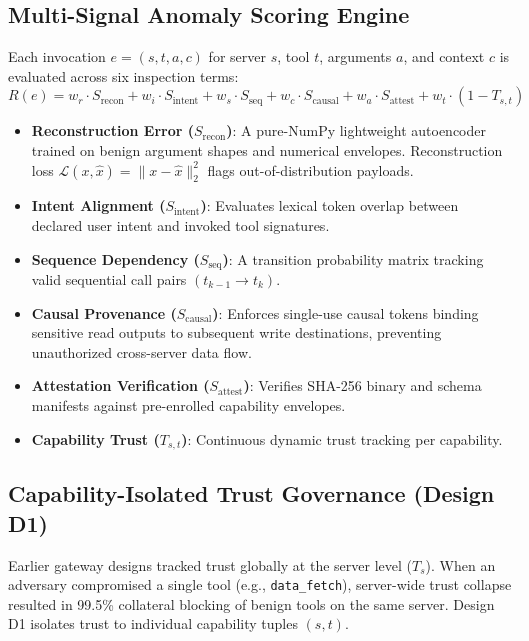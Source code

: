 \documentclass{llncs}
\begin{document}
\subsection{Multi-Signal Anomaly Scoring Engine}
Each invocation $e = (s, t, a, c)$ for server $s$, tool $t$, arguments $a$, and context $c$ is evaluated across six inspection terms:
\begin{equation}
R(e) = w_r \cdot S_{\text{recon}} + w_i \cdot S_{\text{intent}} + w_s \cdot S_{\text{seq}} + w_c \cdot S_{\text{causal}} + w_a \cdot S_{\text{attest}} + w_t \cdot (1 - T_{s,t})
\end{equation}
\begin{itemize}
    \item \textbf{Reconstruction Error ($S_{\text{recon}}$)}: A pure-NumPy lightweight autoencoder trained on benign argument shapes and numerical envelopes. Reconstruction loss $\mathcal{L}(x, \hat{x}) = \|x - \hat{x}\|_2^2$ flags out-of-distribution payloads.
    \item \textbf{Intent Alignment ($S_{\text{intent}}$)}: Evaluates lexical token overlap between declared user intent and invoked tool signatures.
    \item \textbf{Sequence Dependency ($S_{\text{seq}}$)}: A transition probability matrix tracking valid sequential call pairs $(t_{k-1} \to t_k)$.
    \item \textbf{Causal Provenance ($S_{\text{causal}}$)}: Enforces single-use causal tokens binding sensitive read outputs to subsequent write destinations, preventing unauthorized cross-server data flow.
    \item \textbf{Attestation Verification ($S_{\text{attest}}$)}: Verifies SHA-256 binary and schema manifests against pre-enrolled capability envelopes.
    \item \textbf{Capability Trust ($T_{s,t}$)}: Continuous dynamic trust tracking per capability.
\end{itemize}

\subsection{Capability-Isolated Trust Governance (Design D1)}
Earlier gateway designs tracked trust globally at the server level ($T_s$). When an adversary compromised a single tool (e.g., \texttt{data\_fetch}), server-wide trust collapse resulted in 99.5\% collateral blocking of benign tools on the same server. Design D1 isolates trust to individual capability tuples $(s, t)$.
\end{document}
